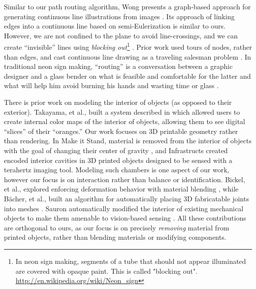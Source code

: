 Similar to our path routing algorithm, Wong presents a graph-based approach for generating continuous line illustrations from images \cite{Wong-continuousline}. Its approach of linking edges into a continuous line based on semi-Eulerization is similar to ours.  However, we are not confined to the plane to avoid line-crossings, and we can create ``invisible'' lines using \emph{blocking out}\footnote{In neon sign making, segments of a tube that should not appear illuminated are covered with opaque paint. This is called "blocking out". \url{http://en.wikipedia.org/wiki/Neon_sign}} . Prior work used tours of nodes, rather than edges, and cast continuous line drawing as a traveling salesman problem \cite{Bosch-tsp}. In traditional neon sign making, ``routing'' is a conversation between a graphic designer and a glass bender on what is feasible and comfortable for the latter and what will help him avoid burning his hands and wasting time or glass \cite{strattman1997neon}.

There is prior work on modeling the interior of objects (as opposed to their exterior).  Takayama, et al., built a system described in \cite{Takayama-fruit} which allowed users to create internal color maps of the interior of objects, allowing them to see digital ``slices'' of their ``oranges.''  Our work focuses on 3D printable geometry rather than rendering.  In Make it Stand, material is removed from the interior of objects with the goal of changing their center of gravity \cite{Prevost-makeitstand}, and Infrastructs created encoded interior cavities in 3D printed objects designed to be sensed with a terahertz imaging tool.  Modeling such chambers is one aspect of our work, however our focus is on interaction rather than balance or identification.  Bickel, et al., explored enforcing deformation behavior with material blending \cite{Bickel-deformation}, while B\"{a}cher, et al., built an algorithm for automatically placing 3D fabricatable joints into meshes \cite{Bacher-articulated}.  Sauron automatically modified the interior of existing mechanical objects to make them amenable to vision-based sensing \cite{Savage-sauron}.  All these contributions are orthogonal to ours, as our focus is on precisely \emph{removing} material from printed objects, rather than blending materials or modifying components.